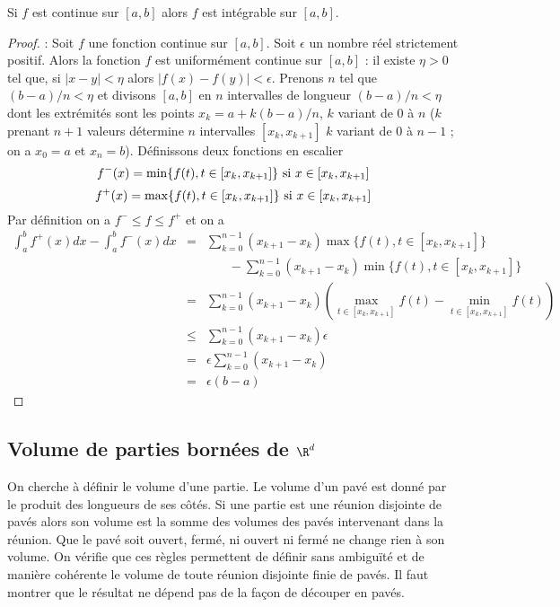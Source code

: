 \documentclass[class=report,crop=false]{standalone}
\begin{document}
{{{{{{{{{{{{{{{{{{\begin{theoreme}
Si $f$ est continue sur $[a,b]$ alors $f$ est intégrable sur $[a,b]$.
\end{theoreme}
\begin{proof} \rm : Soit $f$ une fonction continue sur $[a,b]$. Soit $\epsilon$ un nombre réel strictement positif. Alors la fonction $f$ est uniformément continue sur $[a,b]$ : il existe $\eta>0$ tel que, si $|x-y|<\eta$ alors $|f(x)-f(y)|<\epsilon$. Prenons $n$ tel que $(b-a)/n<\eta$ et divisons $[a,b]$ en $n$ intervalles de longueur $(b-a)/n<\eta$ dont les extrémités sont les points $x_k=a+k(b-a)/n$, $k$ variant de 0 \`a $n$ ($k$ prenant $n+1$ valeurs détermine $n$ intervalles $[x_k,x_{k+1}]$ $k$ variant de $0$ \`a $n-1$ ; on a $x_0=a$ et $x_n=b$). Définissons deux fonctions en escalier
$$
f^-(x)=\min\{f(t),t\in[x_k,x_{k+1}]\}\ {\rm si}\  x\in [x_k,x_{k+1}]
$$
$$
f^+(x)=\max\{f(t),t\in[x_k,x_{k+1}]\}\ {\rm si}\ x\in [x_k,x_{k+1}]
$$
Par définition on a $f^-\leq f\leq f^+$ et on a
\begin{eqnarray*}
\int_a^bf^+(x)dx-\int_a^bf^-(x)dx&=&\sum_{k=0}^{n-1}(x_{k+1}-x_k)\max\{f(t),t\in[x_k,x_{k+1}]\}\\
& & \ \ \ \ \ \ \ \ -\sum_{k=0}^{n-1}(x_{k+1}-x_k)\min\{f(t),t\in[x_k,x_{k+1}]\}\\
&=&\sum_{k=0}^{n-1}(x_{k+1}-x_k)(\max_{t\in[x_k,x_{k+1}]}f(t)-\min_{t\in[x_k,x_{k+1}]}f(t))\\
&\leq&\sum_{k=0}^{n-1}(x_{k+1}-x_k)\epsilon\\
&=&\epsilon \sum_{k=0}^{n-1}(x_{k+1}-x_k)\\
&=&\epsilon(b-a)
\end{eqnarray*}
\end{proof}

\subsection{Volume de parties bornées de $\R^d$}
On cherche \`a définir le volume d'une partie. Le volume d'un pavé est donné par le produit des longueurs de ses c\^otés.
Si une partie est une réunion disjointe de pavés alors son volume est la somme des volumes des pavés intervenant dans la réunion.
Que le pavé soit ouvert, fermé, ni ouvert ni fermé ne change rien \`a son volume.
On vérifie que ces r\`egles permettent de définir sans ambiguïté et de mani\`ere cohérente le volume de toute réunion disjointe finie de pavés. Il faut montrer que le résultat ne dépend pas de la fa\c con de découper en pavés.

}}}}}}}}}}}}}}}}}}
\end{document}
